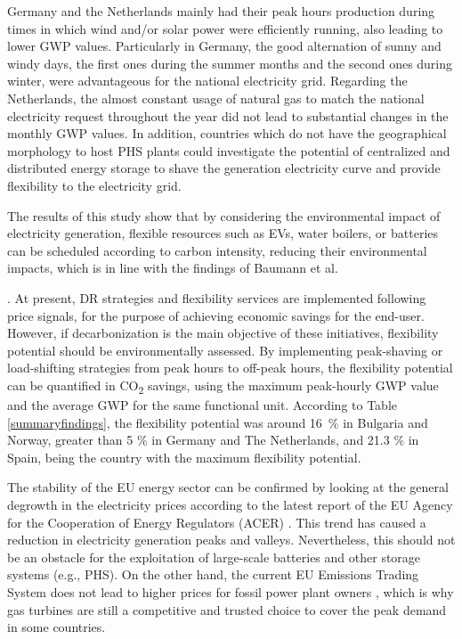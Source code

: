 {{{{{Germany and the Netherlands mainly had their peak hours production during times in which wind and/or solar power were efficiently running, also leading to lower  GWP values. Particularly in Germany, the good alternation of sunny and windy days, the first ones during the summer months and the second ones during winter, were advantageous for the national electricity grid. Regarding the Netherlands, the almost constant usage of natural gas to match the national electricity request throughout the year did not lead to substantial changes in the monthly GWP values. In addition, countries which do not have the geographical morphology to host PHS plants could investigate the potential of centralized and distributed energy storage to shave the generation electricity curve and provide flexibility to the electricity grid. 

The results of this study show that by considering the environmental impact of electricity generation, flexible resources such as EVs, water boilers, or batteries can be scheduled according to carbon intensity, reducing their environmental impacts, which is in line with the findings of Baumann et al. \cite{Baumann2019}}. At present, DR strategies and flexibility services are implemented following price signals, for the purpose of achieving economic savings for the end-user. However, if decarbonization is the main objective of these initiatives, flexibility potential should be environmentally assessed. By implementing peak-shaving or load-shifting strategies from peak hours to off-peak hours, the flexibility potential can be quantified in CO\textsubscript{2} savings, using the maximum peak-hourly GWP value and the average GWP for the same functional unit. According to Table \ref{summaryfindings}, the flexibility potential was around 16~\% in Bulgaria and Norway, greater than 5 \% in Germany and The Netherlands, and 21.3 \% in Spain, being the country with the maximum flexibility potential.

The stability of the EU energy sector can be confirmed by looking at the general degrowth in the electricity prices according to the latest report of the EU Agency for the Cooperation of Energy Regulators (ACER) \cite{ACER2018}. This trend has caused a reduction in electricity generation peaks and valleys. Nevertheless, this should not be an obstacle for the exploitation of large-scale batteries and other storage systems (e.g., PHS). On the other hand, the current EU Emissions Trading System does not lead to higher prices for fossil power plant owners \cite{DEANE20101293}, which is why gas turbines are still a competitive and trusted choice to cover the peak demand in some countries.

}}}}
